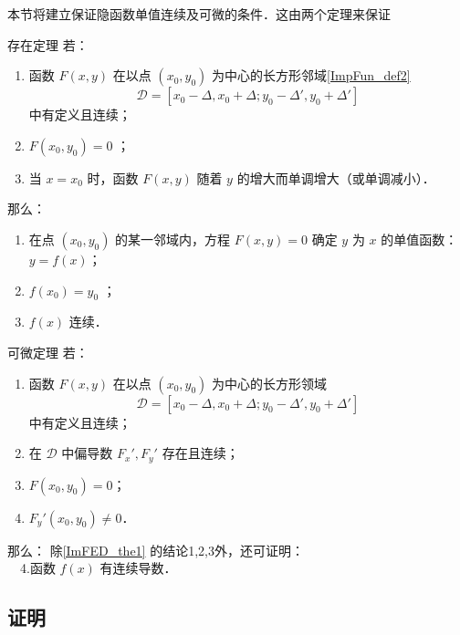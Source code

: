 
\begin{issues}
\issueTODO
\end{issues}

本节将建立保证隐函数单值连续及可微的条件．这由两个定理来保证
\begin{theorem}{存在定理}\label{ImFED_the1}
若：\begin{enumerate}
\item 函数 $F(x,y)$ 在以点 $(x_0,y_0)$ 为中心的长方形邻域\autoref{ImpFun_def2}~
\begin{equation}
\mathcal{D}=[x_0-\Delta,x_0+\Delta;y_0-\Delta',y_0+\Delta']
\end{equation}
中有定义且连续；
\item $F(x_0,y_0)=0$ ；
\item 当 $x=x_0$ 时，函数 $F(x,y)$ 随着 $y$ 的增大而单调增大（或单调减小）．
\end{enumerate}
那么：
\begin{enumerate}
\item 在点 $(x_0,y_0)$ 的某一邻域内，方程 $F(x,y)=0$ 确定 $y$ 为 $x$ 的单值函数： $y=f(x)$；
\item $f(x_0)=y_0$ ；
\item $f(x)$ 连续．
\end{enumerate}
\end{theorem}

\begin{theorem}{可微定理}
若：
\begin{enumerate}
\item 函数 $F(x,y)$ 在以点 $(x_0,y_0)$ 为中心的长方形领域
\begin{equation}
\mathcal{D}=[x_0-\Delta,x_0+\Delta;y_0-\Delta',y_0+\Delta']
\end{equation}
中有定义且连续；
\item 在 $\mathcal{D}$ 中偏导数 $F_x',F_y'$ 存在且连续；
\item $F(x_0,y_0)=0$；
\item $F_y'(x_0,y_0)\neq0$．
\end{enumerate}
那么：
除\autoref{ImFED_the1} 的结论1,2,3外，还可证明：\\
$\quad$4.函数 $f(x)$ 有连续导数．

\end{theorem}
\subsection{证明}
